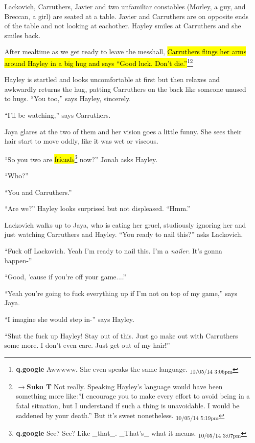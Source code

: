 Lackovich, Carruthers, Javier and two unfamiliar constables (Morley, a guy, and Breccan, a girl) are seated at a table.  Javier and Carruthers are on opposite ends of the table and not looking at eachother.  Hayley smiles at Carruthers and she smiles back.  

After mealtime as we get ready to leave the messhall, \hl{Carruthers flings her arms around Hayley in a big hug and says ``Good luck.  Don't die.''}\footnote{\textbf{q.google }Awwwww.  She even speaks the same language. \textsubscript{10/05/14 3:06pm}}\footnote{$\rightarrow$\textbf{Suko T }Not really.  Speaking Hayley's language would have been something more like:''I encourage you to make every effort to avoid being in a fatal situation, but I understand if such a thing is unavoidable.  I would be saddened by your death.''  But it's sweet nonetheless. \textsubscript{10/05/14 5:19pm}}

Hayley is startled and looks uncomfortable at first but then relaxes and awkwardly returns the hug, patting Carruthers on the back like someone unused to hugs.  ``You too,'' says Hayley, sincerely.

``I'll be watching,'' says Carruthers.

Jaya glares at the two of them and her vision goes a little funny.  She sees their hair start to move oddly, like it was wet or viscous.

``So you two are \hl{friends}\footnote{\textbf{q.google }See?  See?  Like \_that\_.  \_That's\_ what it means. \textsubscript{10/05/14 3:07pm}} now?'' Jonah asks Hayley.

``Who?''

``You and Carruthers.''

``Are we?'' Hayley looks surprised but not displeased.  ``Hmm.''

Lackovich walks up to Jaya, who is eating her gruel, studiously ignoring her and just watching Carruthers and Hayley.  ``You ready to nail this?'' asks Lackovich.

``Fuck off Lackovich.  Yeah I'm ready to nail this.  I'm a \textit{nailer}.  It's gonna happen-''

``Good, 'cause if you're off your game....''

``Yeah you're going to fuck everything up if I'm not on top of my game,'' says Jaya.

``I imagine she would step in-'' says Hayley.

``Shut the fuck up Hayley!  Stay out of this.  Just go make out with Carruthers some more.  I don't even care.  Just get out of my hair!''

